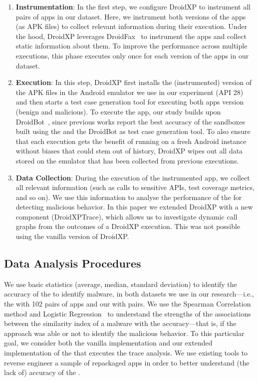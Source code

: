 \begin{enumerate}[S1]
 \item \textbf{Instrumentation}: In the first step,
we configure DroidXP to instrument all pairs of apps in our dataset.
Here, we instrument both versions of the apps (as APK files) to collect relevant information during their execution. Under the hood, DroidXP leverages
DroidFax~\cite{DBLP:conf/icsm/CaiR17a} to instrument the apps and collect static
information about them. To improve the performance across multiple executions,
this phase executes only once for each version of the apps in our dataset.

\item \textbf{Execution}: In this step, DroidXP first installs the (instrumented) version of the APK files in the Android emulator we use in our experiment (API 28) and then starts a test case generation tool for executing both apps version (benign and malicious). To execute the app, our study builds upon DroidBot~\cite{DBLP:conf/icse/LiYGC17}, since previous works report the best accuracy of the sandboxes built using the \mas and the DroidBot as test case generation tool. To also ensure that each execution gets the benefit of running on a fresh Android instance without biases that could stem out of history, DroidXP wipes out all data stored on the emulator that has been collected from previous executions.


\item \textbf{Data Collection}: During the execution of the instrumented app, we collect all relevant information (such as calls to sensitive APIs, test coverage metrics, and so on). We use this information to analyse the performance of the \mas for detecting malicious behavior. In this paper we extended DroidXP with a new component (DroidXPTrace), which allows us to investigate dynamic call graphs from the outcomes of a DroidXP execution. This was not possible using the vanilla version of DroidXP.
\end{enumerate}

\subsection{Data Analysis Procedures} \label{sec:dataAnalysisProc}

We use basic statistics (average, median, standard deviation) to identify the
accuracy of the \mas to identify malware, in both
datasets we use in our research---i.e., the \sds
with 102 pairs of apps and our \cds with
\apps pairs. We use the Spearman Correlation~\cite{spearman-correlation} method and
Logistic Regression~\cite{statistical-learning} to understand the strengths of
the associations between the similarity index of a
malware with the \mas accuracy---that is,
if the approach was able or not to identify the malicious behavior.
To this particular goal, we consider
both the vanilla implementation and our extended implementation
of the \mas that executes the trace analysis. We use
existing tools to reverse engineer a sample of repackaged
apps in order to better understand (the lack of) accuracy
of the \mas.

